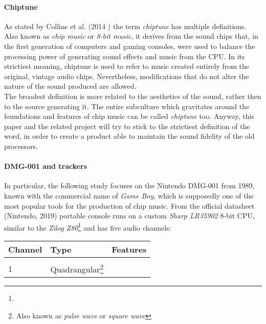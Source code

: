 \documentclass[]{article}
\begin{document}
        \paragraph{Chiptune}
        As stated by Collins et al. (2014 )\nocite{COLLINS2014} the term \emph{chiptune} has multiple 
        definitions. Also known as \emph{chip music} or \emph{8-bit music}, it derives from the sound chips that,
         in the first generation of computers and gaming consoles,
         were used to balance the processing power of generating sound effects and music from the
        CPU. In its strictiest meaning, chiptune is used to refer to music created entirely from the original, vintage audio 
        chips. Nevertheless, modifications that do not alter the nature of the sound produced are allowed.\\
        The broadest definition is more related to the aesthetics of the sound, rather then to the source
        generating it. The entire subculture which gravitates around the foundations and features of chip
        music can be called \emph{chiptune} too. Anyway, this paper and the related project will try to stick
        to the strictiest definition of the word, in order to create a product able to maintain the sound fidelity
        of the old processors.

        \paragraph{DMG-001 and trackers}
        In particular, the following study focuses on the Nintendo DMG-001 from 1989, known with the commercial 
        name of \emph{Game Boy}, which is supposedly one of the most popular tools for the production of chip music.
        From the official datasheet (Nintendo, 2019)\nocite{NINTENDO2019} portable console runs on a custom 
        \emph{Sharp LR35902} 8-bit CPU, similar to the \emph{Zilog Z80}\footnote{} 
        and has five audio channels:\\[10pt]
        

        \begin{tabular}{l l l}
            \hline
            \textbf{Channel} & \textbf{Type} & \textbf{Features}\\
            \hline \\[-6pt]
            1 & Quadrangular\footnote{Also known as \emph{pulse wave} or \emph{square wave}} &
            
        \end{tabular}
        
\end{document}
